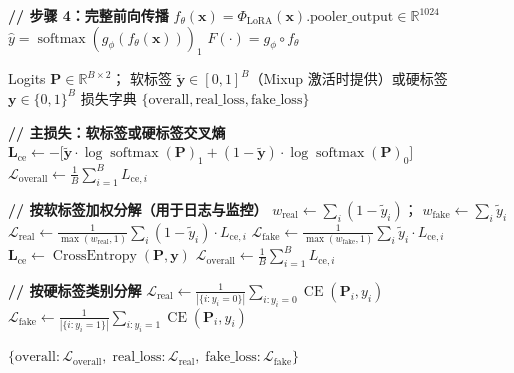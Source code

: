 \documentclass[12pt]{article}
\begin{document}
\begin{algorithm}[p]
\begin{algorithmic}[1]
\State \textbf{// 步骤 4：完整前向传播}
\State $f_\theta(\mathbf{x}) = \Phi_{\text{LoRA}}(\mathbf{x}).\text{pooler\_output} \in \mathbb{R}^{1024}$ 
\State $\hat{y} = \operatorname{softmax}(g_\phi(f_\theta(\mathbf{x})))_1$ 
\State \Return $F(\cdot) = g_\phi \circ f_\theta$
\end{algorithmic}
\end{algorithm}

\clearpage
\begin{algorithm}[p]
\caption{损失计算}
\label{alg:loss}
\begin{algorithmic}[1]
\Require
  Logits $\mathbf{P} \in \mathbb{R}^{B \times 2}$；
  软标签 $\tilde{\mathbf{y}} \in [0,1]^{B}$（Mixup 激活时提供）或硬标签 $\mathbf{y} \in \{0,1\}^{B}$
\Ensure
  损失字典 $\{\text{overall}, \text{real\_loss}, \text{fake\_loss}\}$

\State \textbf{// 主损失：软标签或硬标签交叉熵}
  \State $\mathbf{L}_{\text{ce}} \gets -\big[\tilde{\mathbf{y}} \cdot \log\operatorname{softmax}(\mathbf{P})_1 + (1 - \tilde{\mathbf{y}}) \cdot \log\operatorname{softmax}(\mathbf{P})_0\big]$
  \State $\mathcal{L}_{\text{overall}} \gets \frac{1}{B}\sum_{i=1}^{B} L_{\text{ce},i}$

  \State \textbf{// 按软标签加权分解（用于日志与监控）}
  \State $w_{\text{real}} \gets \sum_i (1 - \tilde{y}_i)$；\quad
        $w_{\text{fake}} \gets \sum_i \tilde{y}_i$
  \State $\mathcal{L}_{\text{real}} \gets \frac{1}{\max(w_{\text{real}}, 1)} \sum_i (1 - \tilde{y}_i) \cdot L_{\text{ce},i}$
  \State $\mathcal{L}_{\text{fake}} \gets \frac{1}{\max(w_{\text{fake}}, 1)} \sum_i \tilde{y}_i \cdot L_{\text{ce},i}$
\Else
  \State $\mathbf{L}_{\text{ce}} \gets \operatorname{CrossEntropy}(\mathbf{P}, \mathbf{y})$
  \State $\mathcal{L}_{\text{overall}} \gets \frac{1}{B}\sum_{i=1}^{B} L_{\text{ce},i}$

  \State \textbf{// 按硬标签类别分解}
  \State $\mathcal{L}_{\text{real}} \gets \frac{1}{|\{i:y_i=0\}|} \sum_{i: y_i=0} \operatorname{CE}(\mathbf{P}_i, y_i)$
  \State $\mathcal{L}_{\text{fake}} \gets \frac{1}{|\{i:y_i=1\}|} \sum_{i: y_i=1} \operatorname{CE}(\mathbf{P}_i, y_i)$
\EndIf

\State \Return $\{\text{overall}: \mathcal{L}_{\text{overall}},\;
                  \text{real\_loss}: \mathcal{L}_{\text{real}},\;
                  \text{fake\_loss}: \mathcal{L}_{\text{fake}}\}$
\end{algorithmic}
\end{algorithm}
\end{document}
